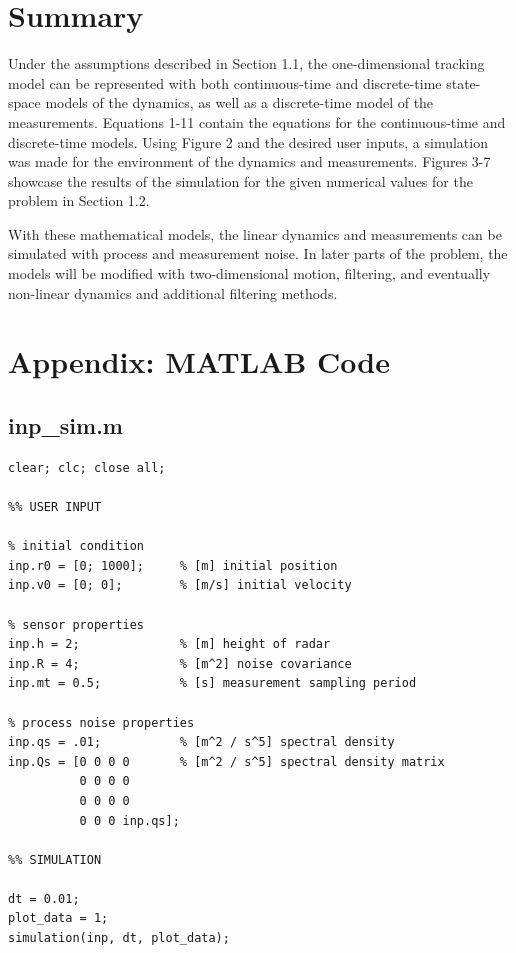 \documentclass{article}
\begin{document}
\clearpage

\section{Summary}

Under the assumptions described in Section 1.1, the one-dimensional tracking model can be represented with both continuous-time and discrete-time state-space models of the dynamics, as well as a discrete-time model of the measurements. Equations 1-11 contain the equations for the continuous-time and discrete-time models. Using Figure 2 and the desired user inputs, a simulation was made for the environment of the dynamics and measurements. Figures 3-7 showcase the results of the simulation for the given numerical values for the problem in Section 1.2.
\par
With these mathematical models, the linear dynamics and measurements can be simulated with process and measurement noise. In later parts of the problem, the models will be modified with two-dimensional motion, filtering, and eventually non-linear dynamics and additional filtering methods. 

\section{Appendix: MATLAB Code}

\subsection{inp\_sim.m}
\begin{lstlisting}[style=Matlab-editor]
clear; clc; close all;

%% USER INPUT

% initial condition
inp.r0 = [0; 1000];     % [m] initial position
inp.v0 = [0; 0];        % [m/s] initial velocity

% sensor properties
inp.h = 2;              % [m] height of radar
inp.R = 4;              % [m^2] noise covariance
inp.mt = 0.5;           % [s] measurement sampling period

% process noise properties
inp.qs = .01;           % [m^2 / s^5] spectral density
inp.Qs = [0 0 0 0       % [m^2 / s^5] spectral density matrix
          0 0 0 0 
          0 0 0 0
          0 0 0 inp.qs];

%% SIMULATION

dt = 0.01;
plot_data = 1;
simulation(inp, dt, plot_data);
\end{lstlisting}
\end{document}

